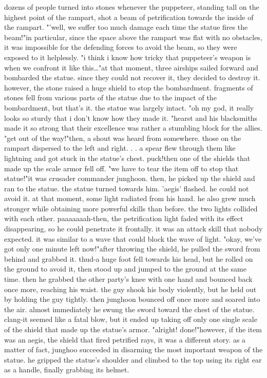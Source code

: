 dozens of people turned into stones whenever the puppeteer, standing tall on the highest point of the rampart, shot a beam of petrification towards the inside of the rampart.
 "'well, we suffer too much damage each time the statue fires the beam!"in particular, since the space above the rampart was flat with no obstacles, it was impossible for the defending forces to avoid the beam, so they were exposed to it helplessly.
"i think i know how tricky that puppeteer's weapon is when we confront it like this…"at that moment, three airships sailed forward and bombarded the statue.
 since they could not recover it, they decided to destroy it.
however, the stone raised a huge shield to stop the bombardment.
fragments of stones fell from various parts of the statue due to the impact of the bombardment, but that's it.
 the statue was largely intact.
"oh my god, it really looks so sturdy that i don't know how they made it.
"hearst and his blacksmiths made it so strong that their excellence was rather a stumbling block for the allies.
"get out of the way!"then, a shout was heard from somewhere.
 those on the rampart dispersed to the left and right.
.
.
a spear flew through them like lightning and got stuck in the statue's chest.
 puck!then one of the shields that made up the scale armor fell off.
"we have to tear the item off to stop that statue!"it was crusader commander junghoon.
then, he picked up the shield and ran to the statue.
the statue turned towards him.
 'aegis' flashed.
 he could not avoid it.
at that moment, some light radiated from his hand.
 he also grew much stronger while obtaining more powerful skills than before.
 the two lights collided with each other.
paaaaaaah-then, the petrification light faded with its effect disappearing, so he could penetrate it frontally.
 it was an attack skill that nobody expected.
 it was similar to a wave that could block the wave of light.
"okay, we've got only one minute left now!"after throwing the shield, he pulled the sword from behind and grabbed it.
thud-a huge foot fell towards his head, but he rolled on the ground to avoid it, then stood up and jumped to the ground at the same time.
 then he grabbed the other party's knee with one hand and bounced back once more, reaching his waist.
 the guy shook his body violently, but he held out by holding the guy tightly.
then junghoon bounced off once more and soared into the air.
 almost immediately he swung the sword toward the chest of the statue.
clang-it seemed like a fatal blow, but it ended up taking off only one single scale of the shield that made up the statue's armor.
"alright! done!"however, if the item was an aegis, the shield that fired petrified rays, it was a different story.
as a matter of fact, junghoo succeeded in disarming the most important weapon of the statue.
he gripped the statue's shoulder and climbed to the top using its right ear as a handle, finally grabbing its helmet.


